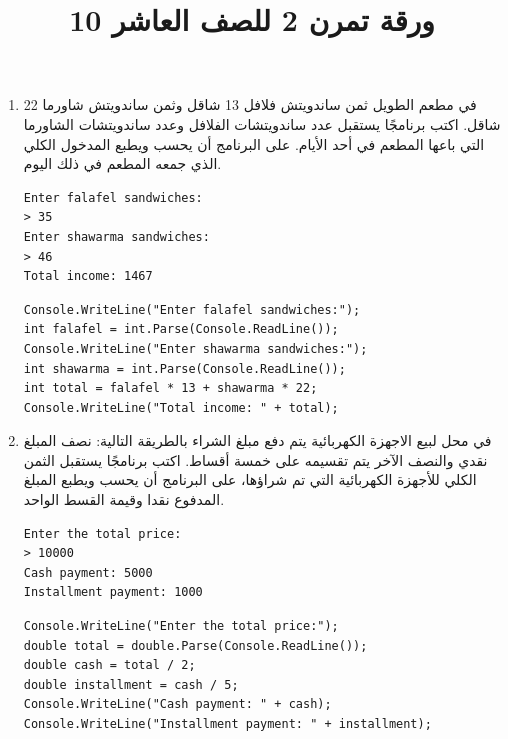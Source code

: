 \documentclass[14pt]{extarticle}
\title{ورقة تمرن 2 للصف العاشر 10}
\begin{document}
\maketitle
\thispagestyle{fancy}

\begin{enumerate}[itemsep=2cm]


\item
في مطعم الطويل ثمن ساندويتش فلافل 13 شاقل وثمن ساندويتش شاورما 22 شاقل. اكتب برنامجًا يستقبل عدد ساندويتشات الفلافل وعدد ساندويتشات الشاورما التي باعها المطعم في أحد الأيام. على البرنامج أن يحسب ويطبع المدخول الكلي الذي جمعه المطعم في ذلك اليوم.
{\small
\ifdetailed
\begin{boxExample}
\begin{english}
\begin{verbatim}
Enter falafel sandwiches:
> 35
Enter shawarma sandwiches:
> 46
Total income: 1467
\end{verbatim}
\end{english}
\end{boxExample}
\fi
\ifwithsols
\begin{boxSolution}
\begin{english}
\begin{verbatim}
Console.WriteLine("Enter falafel sandwiches:");
int falafel = int.Parse(Console.ReadLine());
Console.WriteLine("Enter shawarma sandwiches:");
int shawarma = int.Parse(Console.ReadLine());
int total = falafel * 13 + shawarma * 22;
Console.WriteLine("Total income: " + total);
\end{verbatim}
\end{english}
\end{boxSolution}
\clearpage
\fi
}

\item
في محل لبيع الاجهزة الكهربائية يتم دفع مبلغ الشراء بالطريقة التالية: نصف المبلغ نقدي والنصف الآخر يتم تقسيمه على خمسة أقساط. اكتب برنامجًا يستقبل الثمن الكلي للأجهزة الكهربائية التي تم شراؤها، على البرنامج أن يحسب ويطبع المبلغ المدفوع نقدا وقيمة القسط الواحد.
{\small
\ifdetailed
\begin{boxExample}
\begin{english}
\begin{verbatim}
Enter the total price:
> 10000
Cash payment: 5000
Installment payment: 1000
\end{verbatim}
\end{english}
\end{boxExample}
\fi
\ifwithsols
\begin{boxSolution}
\begin{english}
\begin{verbatim}
Console.WriteLine("Enter the total price:");
double total = double.Parse(Console.ReadLine());
double cash = total / 2;
double installment = cash / 5;
Console.WriteLine("Cash payment: " + cash);
Console.WriteLine("Installment payment: " + installment);
\end{verbatim}
\end{english}
\end{boxSolution}
\fi
}
\clearpage


\end{enumerate}
\end{document}
